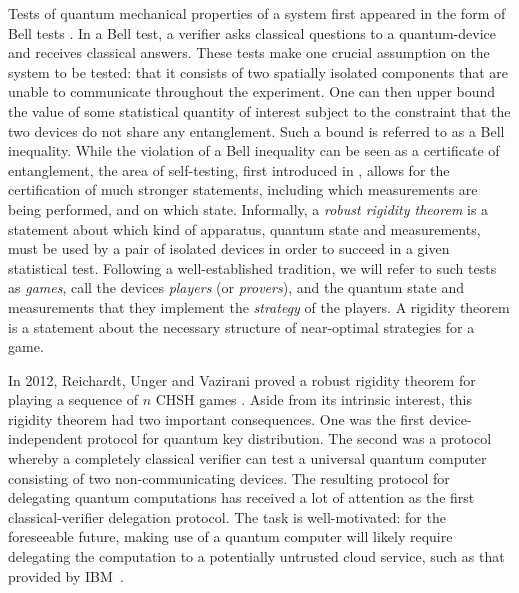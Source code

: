 \documentclass[11pt]{article}
\begin{document}
Tests of quantum mechanical properties of a system first appeared in the form of Bell tests \cite{Bell:64a,Clauser:69a}. In a Bell test, a verifier asks classical questions to a quantum-device and receives classical answers. These tests make one crucial assumption on the system to be tested: that it consists of two spatially isolated components that %
are unable to communicate throughout the experiment. One can then upper bound the value of some statistical quantity of interest subject to the constraint that the two devices do not share any entanglement. Such a bound is referred to as a Bell inequality. While the violation of a Bell inequality can be seen as a certificate of entanglement, the area of self-testing, first introduced in \cite{mayers2004selftesting}, allows for the certification of much stronger statements, including  which measurements are being performed, and on which state.  Informally, a \emph{robust rigidity theorem} is a statement about which kind of apparatus, quantum state and measurements, must be used by a pair of isolated devices in order to succeed in a given statistical test. Following a well-established tradition, we will refer to such tests as \emph{games}, call the devices \emph{players} (or \emph{provers}), and the quantum state and measurements that they implement the \emph{strategy} of the players. A rigidity theorem is a statement about the necessary structure of near-optimal strategies for a game.  

In 2012, Reichardt, Unger and Vazirani proved a robust rigidity theorem for
playing a sequence of $n$ CHSH games \cite{reichardt2012classical}. Aside from
its intrinsic interest, this rigidity theorem had two important consequences.
One was the first device-independent protocol for quantum key distribution. The
second was a protocol whereby a completely classical verifier can test a
universal quantum computer consisting of two non-communicating devices.  The resulting
 protocol for delegating quantum
computations has received a lot of attention as the first classical-verifier delegation protocol. 
The task is well-motivated: for the foreseeable future, making use of a quantum computer will likely require delegating the computation to a potentially untrusted cloud service, such as that provided by IBM~\cite{ibmcloud}.  
\end{document}
